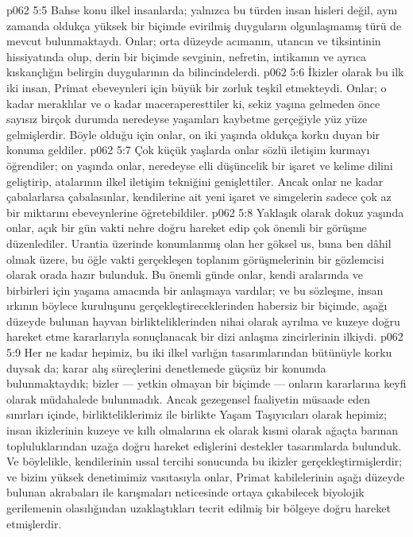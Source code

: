 \vs p062 5:5 Bahse konu ilkel insanlarda; yalnızca bu türden insan hisleri değil, aynı zamanda oldukça yüksek bir biçimde evirilmiş duyguların olgunlaşmamış türü de mevcut bulunmaktaydı. Onlar; orta düzeyde acımanın, utancın ve tiksintinin hissiyatında olup, derin bir biçimde sevginin, nefretin, intikamın ve ayrıca kıskançlığın belirgin duygularının da bilincindelerdi.
\vs p062 5:6 İkizler olarak bu ilk iki insan, Primat ebeveynleri için büyük bir zorluk teşkil etmekteydi. Onlar; o kadar meraklılar ve o kadar maceraperesttiler ki, sekiz yaşına gelmeden önce sayısız birçok durumda neredeyse yaşamları kaybetme gerçeğiyle yüz yüze gelmişlerdir. Böyle olduğu için onlar, on iki yaşında oldukça korku duyan bir konuma geldiler.
\vs p062 5:7 Çok küçük yaşlarda onlar sözlü iletişim kurmayı öğrendiler; on yaşında onlar, neredeyse elli düşüncelik bir işaret ve kelime dilini geliştirip, atalarının ilkel iletişim tekniğini genişlettiler. Ancak onlar ne kadar çabalarlarsa çabalasınlar, kendilerine ait yeni işaret ve simgelerin sadece çok az bir miktarını ebeveynlerine öğretebildiler.
\vs p062 5:8 Yaklaşık olarak dokuz yaşında onlar, açık bir gün vakti nehre doğru hareket edip çok önemli bir görüşme düzenlediler. Urantia üzerinde konumlanmış olan her göksel us, buna ben dâhil olmak üzere, bu öğle vakti gerçekleşen toplanım görüşmelerinin bir gözlemcisi olarak orada hazır bulunduk. Bu önemli günde onlar, kendi aralarında ve birbirleri için yaşama amacında bir anlaşmaya vardılar; ve bu sözleşme, insan ırkının böylece kuruluşunu gerçekleştireceklerinden habersiz bir biçimde, aşağı düzeyde bulunan hayvan birlikteliklerinden nihai olarak ayrılma ve kuzeye doğru hareket etme kararlarıyla sonuçlanacak bir dizi anlaşma zincirlerinin ilkiydi.
\vs p062 5:9 Her ne kadar hepimiz, bu iki ilkel varlığın tasarımlarından bütünüyle korku duysak da; karar alış süreçlerini denetlemede güçsüz bir konumda bulunmaktaydık; bizler --- yetkin olmayan bir biçimde --- onların kararlarına keyfi olarak müdahalede bulunmadık. Ancak gezegensel faaliyetin müsaade eden sınırları içinde, birlikteliklerimiz ile birlikte Yaşam Taşıyıcıları olarak hepimiz; insan ikizlerinin kuzeye ve kıllı olmalarına ek olarak kısmi olarak ağaçta barınan topluluklarından uzağa doğru hareket edişlerini destekler tasarımlarda bulunduk. Ve böylelikle, kendilerinin ussal tercihi sonucunda bu ikizler  gerçekleştirmişlerdir; ve bizim yüksek denetimimiz vasıtasıyla onlar, Primat kabilelerinin aşağı düzeyde bulunan akrabaları ile karışmaları neticesinde ortaya çıkabilecek biyolojik gerilemenin olasılığından uzaklaştıkları tecrit edilmiş bir bölgeye doğru  hareket etmişlerdir.
